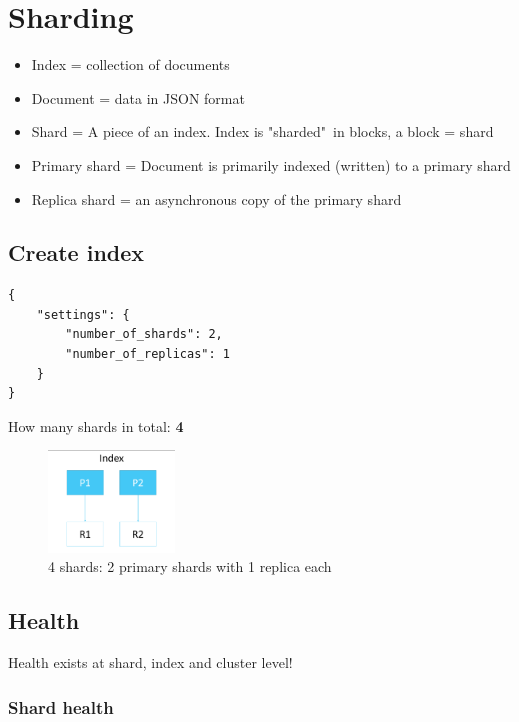 \documentclass{article}
\begin{document}
\section{Sharding}

\begin{itemize}
    \item Index = collection of documents
    \item Document = data in JSON format
    \item Shard = A piece of an index. Index is "sharded"\ in blocks, a block = shard
    \item Primary shard = Document is primarily indexed (written) to a primary shard
    \item Replica shard = an asynchronous copy of the primary shard
\end{itemize}

\subsection{Create index}

\begin{verbatim}
{
    "settings": {
        "number_of_shards": 2,
        "number_of_replicas": 1
    }
}
\end{verbatim}

How many shards in total: \textbf{4}

\begin{figure}[H]
    \centering
    \includegraphics[width=0.3\textwidth]{number-of-shards.png}
    \caption{4 shards: 2 primary shards with 1 replica each}
\end{figure}

\subsection{Health}

Health exists at shard, index and cluster level!

\subsubsection{Shard health}
\end{document}
